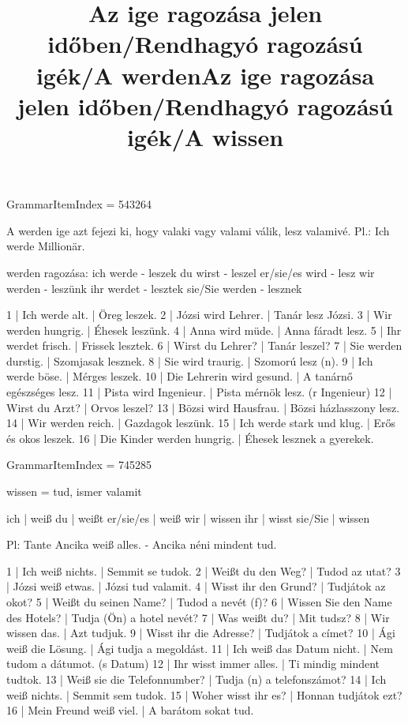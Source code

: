 \title{Az ige ragozása jelen időben/Rendhagyó ragozású igék/A werden}

GrammarItemIndex = 543264

\begin{desc}
A werden ige azt fejezi ki, hogy valaki vagy valami válik, lesz
valamivé.
Pl.: Ich werde Millionär.

werden ragozása:
ich werde - leszek 
du wirst - leszel
er/sie/es wird - lesz
wir werden - leszünk
ihr werdet - lesztek
sie/Sie werden - lesznek
\end{desc}

\begin{exmp}
1 | Ich werde alt. | Öreg leszek.
2 | Józsi wird Lehrer. | Tanár lesz Józsi.
3 | Wir werden hungrig. | Éhesek leszünk.
4 | Anna wird müde. | Anna fáradt lesz.
5 | Ihr werdet frisch. | Frissek lesztek.
6 | Wirst du Lehrer? | Tanár leszel?
7 | Sie werden durstig. | Szomjasak lesznek.
8 | Sie wird traurig. | Szomorú lesz (n).
9 | Ich werde böse. | Mérges leszek.
10 | Die Lehrerin wird gesund. | A tanárnő egészséges lesz.
11 | Pista wird Ingenieur. | Pista mérnök lesz. (r Ingenieur)
12 | Wirst du Arzt? | Orvos leszel?
13 | Bözsi wird Hausfrau. | Bözsi házlasszony lesz.
14 | Wir werden reich. | Gazdagok leszünk.
15 | Ich werde stark und klug. | Erős és okos leszek.
16 | Die Kinder werden hungrig. | Éhesek lesznek a gyerekek.
\end{exmp}

\title{Az ige ragozása jelen időben/Rendhagyó ragozású igék/A wissen}

GrammarItemIndex = 745285

\begin{desc}
wissen = tud, ismer valamit

ich       | weiß
du        | weißt
er/sie/es | weiß
wir       | wissen
ihr       | wisst
sie/Sie   | wissen

Pl: Tante Ancika weiß alles. - Ancika néni mindent tud.
\end{desc}

\begin{exmp}
1 | Ich weiß nichts. | Semmit se tudok.
2 | Weißt du den Weg? | Tudod az utat?
3 | Józsi weiß etwas. | Józsi tud valamit.
4 | Wisst ihr den Grund? | Tudjátok az okot?
5 | Weißt du seinen Name? | Tudod a nevét (f)?
6 | Wissen Sie den Name des Hotels? | Tudja (Ön) a hotel nevét?
7 | Was weißt du? | Mit tudsz?
8 | Wir wissen das. | Azt tudjuk.
9 | Wisst ihr die Adresse? | Tudjátok a címet?
10 | Ági weiß die Lösung. | Ági tudja a megoldást.
11 | Ich weiß das Datum nicht. | Nem tudom a dátumot. (s Datum)
12 | Ihr wisst immer alles. | Ti mindig mindent tudtok.
13 | Weiß sie die Telefonnumber? | Tudja (n) a telefonszámot?
14 | Ich weiß nichts. | Semmit sem tudok.
15 | Woher wisst ihr es? | Honnan tudjátok ezt?
16 | Mein Freund weiß viel. | A barátom sokat tud.
\end{exmp}


